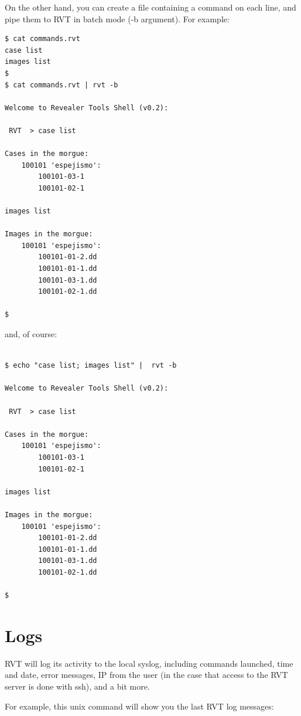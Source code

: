 \documentclass[a4paper,11pt,oneside]{report}
\begin{document}
On the other hand, you can create a file containing a command on each line, and pipe them to RVT in batch mode (-b argument). For example:

\begin{verbatim}
$ cat commands.rvt 
case list
images list
$
$ cat commands.rvt | rvt -b

Welcome to Revealer Tools Shell (v0.2):

 RVT  > case list

Cases in the morgue: 
	100101 'espejismo':
		100101-03-1
		100101-02-1

images list

Images in the morgue: 
	100101 'espejismo':
		100101-01-2.dd
		100101-01-1.dd
		100101-03-1.dd
		100101-02-1.dd

$
\end{verbatim}


and, of course:


\begin{verbatim}
 
$ echo "case list; images list" |  rvt -b

Welcome to Revealer Tools Shell (v0.2):

 RVT  > case list

Cases in the morgue: 
	100101 'espejismo':
		100101-03-1
		100101-02-1

images list

Images in the morgue: 
	100101 'espejismo':
		100101-01-2.dd
		100101-01-1.dd
		100101-03-1.dd
		100101-02-1.dd

$
\end{verbatim}





\section{Logs}

RVT will log its activity to the local syslog, including commands launched, time and date, error messages, IP from the user (in the case that access to the RVT server is done with ssh), and a bit more.

For example, this unix command will show you the last RVT log messages:
\end{document}
